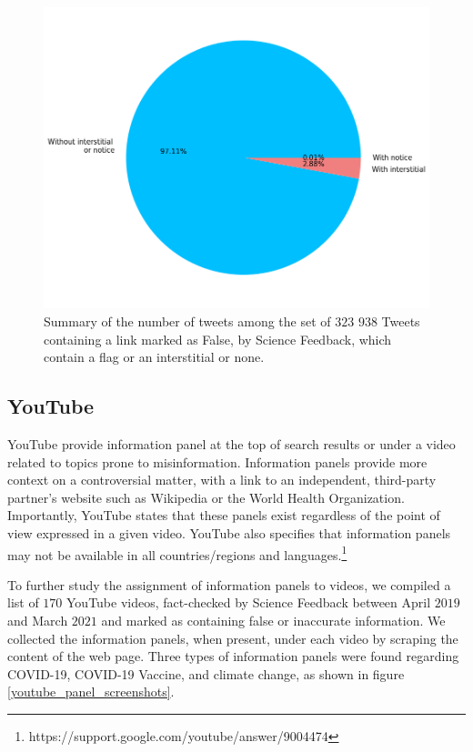 \documentclass{article}
\begin{document}
\begin{figure}[h]
	\centering
	\includegraphics[scale=0.4]{../figure/twitter_pie_flags.png}
	\caption{Summary of the number of tweets among the set of $323$ $938$ Tweets containing a link marked as False, by Science Feedback, which contain a flag or an interstitial or none.}
\label{flags_tab}
\end{figure}

\subsection{YouTube} \label{youtube_panels}

YouTube provide information panel at the top of search results or under a video related to topics prone to misinformation.
Information panels provide more context on a controversial matter, with a link to an independent, third-party partner's website such as Wikipedia or the World Health Organization. 
Importantly, YouTube states that these panels exist regardless of the point of view expressed in a given video.
YouTube also specifies that information panels may not be available in all countries/regions and languages.\footnote{https://support.google.com/youtube/answer/9004474}

\smallskip

To further study the assignment of information panels to videos, we compiled a list of $170$ YouTube videos, fact-checked by Science Feedback between April $2019$ and March $2021$ and marked as containing false or inaccurate information. 
We collected the information panels, when present, under each video by scraping the content of the web page. 
Three types of information panels were found regarding COVID-19, COVID-19 Vaccine, and climate change, as shown in figure \ref{youtube_panel_screenshots}.
\end{document}
